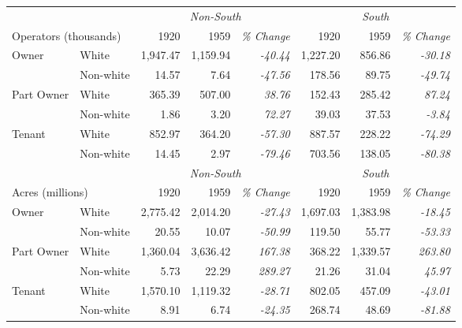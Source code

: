 \begin{tabular}{llrrrrrr}
\hline
       &           & \multicolumn{3}{c}{\textit{Non-South}} & \multicolumn{3}{c}{\textit{South}} \\
\multicolumn{2}{l}{Operators (thousands)}&     1920 &     1959 &  \textit{\% Change} &     1920 &    1959 &  \textit{\% Change}\\
[.5em]
\hline
Owner & White &  1,947.47 &  1,159.94    &    \textit{-40.44} &  1,227.20 &  856.86 &    \textit{-30.18} \\
       & Non-white &    14.57 &     7.64 &    \textit{-47.56} &   178.56 &   89.75 &     \textit{-49.74} \\
       [1em]
Part Owner & White &   365.39 &   507.00 &     \textit{38.76} &   152.43 &  285.42 &    \textit{ 87.24} \\
       & Non-white &     1.86 &     3.20 &     \textit{72.27} &    39.03 &   37.53 &    \textit{ -3.84} \\
       [1em]
Tenant & White     &   852.97 &   364.20 &    \textit{-57.30} &   887.57 &  228.22 &    \textit{-74.29} \\
       & Non-white &    14.45 &     2.97 &    \textit{-79.46} &   703.56 &  138.05 &    \textit{-80.38} \\
       [.5em]
\hline \hline 
       &           & \multicolumn{3}{c}{\textit{Non-South}} & \multicolumn{3}{c}{\textit{South}} \\
\multicolumn{2}{l}{Acres (millions)} &     1920 &     1959 &  \textit{\% Change} &     1920 &    1959 &  \textit{\% Change}\\
[.5em]
\hline
Owner & White      &  2,775.42 &  2,014.20 &    \textit{-27.43} &  1,697.03 &  1,383.98 &    \textit{-18.45} \\
       & Non-white &    20.55  &    10.07  &    \textit{-50.99} &   119.50 &    55.77 &      \textit{-53.33} \\
       [1em]
Part Owner & White &  1,360.04 &  3,636.42 &    \textit{167.38} &   368.22 &  1,339.57 &    \textit{263.80} \\
       & Non-white &     5.73  &    22.29  &    \textit{289.27} &    21.26 &    31.04  &    \textit{ 45.97} \\
       [1em]
Tenant & White     &  1,570.10 &  1,119.32 &    \textit{-28.71} &   802.05 &   457.09 &    \textit{-43.01} \\
       & Non-white &     8.91  &     6.74  &    \textit{-24.35} &   268.74 &    48.69 &    \textit{-81.88} \\
       [.5em]
\hline \hline 
\end{tabular}